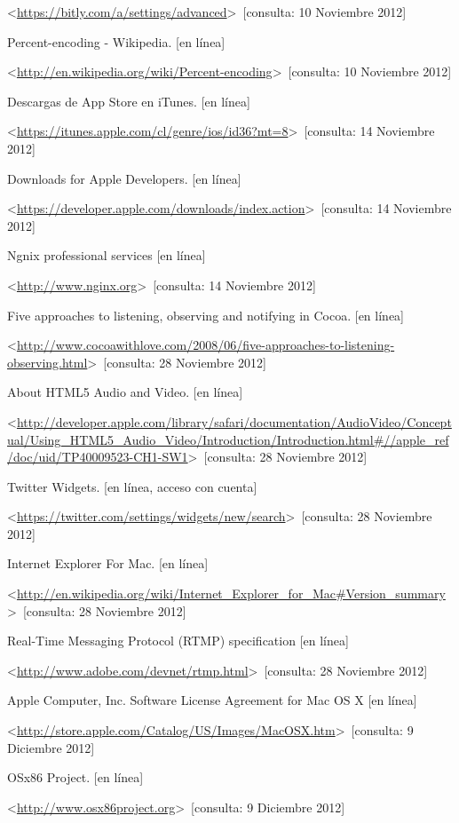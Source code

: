 \begin{thebibliography}{99}
\begin{sloppypar}
\textless \url{https://bitly.com/a/settings/advanced}\textgreater \ [consulta: 10 Noviembre 2012] 

%
Percent-encoding - Wikipedia. [en línea]\

\textless \url{http://en.wikipedia.org/wiki/Percent-encoding}\textgreater \ [consulta: 10 Noviembre 2012] 

%
Descargas de App Store en iTunes. [en línea]\

\textless \url{https://itunes.apple.com/cl/genre/ios/id36?mt=8}\textgreater \ [consulta: 14 Noviembre 2012] 

%
Downloads for Apple Developers. [en línea]\

\textless \url{https://developer.apple.com/downloads/index.action}\textgreater \ [consulta: 14 Noviembre 2012]

%
Ngnix professional services [en línea]\

\textless \url{http://www.nginx.org}\textgreater \ [consulta: 14 Noviembre 2012]

%
Five approaches to listening, observing and notifying in Cocoa. [en línea]\

\textless \url{http://www.cocoawithlove.com/2008/06/five-approaches-to-listening-observing.html}\textgreater \ [consulta: 28 Noviembre 2012]

%
About HTML5 Audio and Video. [en línea]\

\textless \url{http://developer.apple.com/library/safari/documentation/AudioVideo/Conceptual/Using_HTML5_Audio_Video/Introduction/Introduction.html\#//apple_ref/doc/uid/TP40009523-CH1-SW1}\textgreater \ [consulta: 28 Noviembre 2012]

%
Twitter Widgets. [en línea, acceso con cuenta]\

\textless \url{https://twitter.com/settings/widgets/new/search}\textgreater \ [consulta: 28 Noviembre 2012]

%
Internet Explorer For Mac. [en línea]\

\textless \url{http://en.wikipedia.org/wiki/Internet_Explorer_for_Mac\#Version_summary}\textgreater \ [consulta: 28 Noviembre 2012]

%
Real-Time Messaging Protocol (RTMP) specification [en línea]\

\textless \url{http://www.adobe.com/devnet/rtmp.html}\textgreater \ [consulta: 28 Noviembre 2012]

%
Apple Computer, Inc. Software License Agreement for Mac OS X [en línea]\

\textless \url{http://store.apple.com/Catalog/US/Images/MacOSX.htm}\textgreater \ [consulta: 9 Diciembre 2012]

%
OSx86 Project. [en línea]\

\textless \url{http://www.osx86project.org}\textgreater \ [consulta: 9 Diciembre 2012]


\end{sloppypar}
\end{thebibliography}
